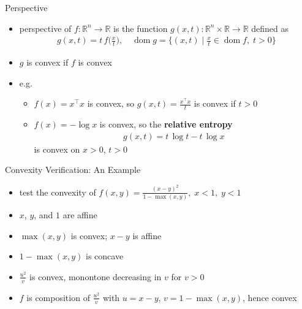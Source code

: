\documentclass[10pt]{beamer}
\newcommand{\ds}{\displaystyle}
\DeclareMathOperator*{\dom}{dom}
\theoremstyle{definition}
\begin{document}
\begin{frame}{Perspective}

\begin{itemize}
  \item perspective of $f:\mathbb{R}^n\to\mathbb{R}$ is the function $\ds g(x, t):\mathbb{R}^n\times\mathbb{R}\to\mathbb{R}$ defined as 
    \begin{align*}
      g(x, t) = t\,f\Big(\frac{x}{t}\Big), \quad\dom g = \Big\{(x, t)\;\Big|\;\frac{x}{t}\in\dom f,\;t > 0\Big\}
    \end{align*}
  \item $g$ is convex if $f$ is convex
  \item e.g.
    \begin{itemize}
      \item $\ds f(x) = x^\top x$ is convex, so $\ds g(x, t) = \frac{x^\top x}{t}$ is convex if $t > 0$
      \item $\ds f(x) = -\log x$ is convex, so the {\bf relative entropy} 
        \begin{align*}
          g(x, t) = t\,\log t - t\,\log x
        \end{align*} 
        is convex on $x > 0$, $t > 0$ 
    \end{itemize}
\end{itemize}

\end{frame}

\begin{frame}{Convexity Verification: An Example}

\begin{itemize}
  \item test the convexity of $\ds f(x, y) = \frac{(x - y)^2}{1 - \max(x, y)}, \; x < 1,\;y < 1$
  \item $x$, $y$, and $1$ are affine
  \item $\max(x, y)$ is convex; $x - y$ is affine
  \item $1 - \max(x, y)$ is concave
  \item $\ds\frac{u^2}{v}$ is convex, monontone decreasing in $v$ for $v > 0$
  \item $f$ is composition of $\ds\frac{u^2}{v}$ with $u = x - y$, $v = 1 - \max(x, y)$, hence convex
\end{itemize}

\end{frame}
\end{document}
